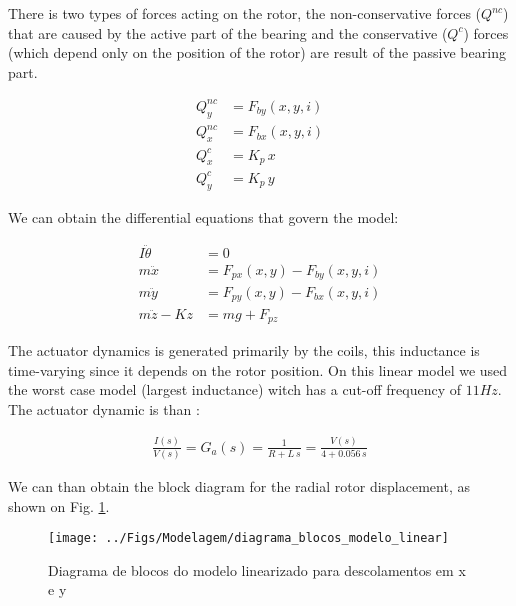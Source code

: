 \documentclass[10pt,fleqn,a4paper,twoside]{article}
\begin{document}
	There is two types of forces acting on the rotor, the  non-conservative forces ($Q^{nc}$) that are caused by the active part of the bearing and the conservative ($Q^{c}$) forces (which depend only on the position of the rotor) are result of the passive bearing part.
	
	\begin{align}
		Q_y^{nc} &= F_{by}(x,y,i)  \\
		Q_x^{nc} &= F_{bx}(x,y,i)  \\
		Q^{c}_x &= K_p \, x \\
		Q^{c}_y &= K_p \, y 
	\end{align}
	
	We can obtain the differential equations that govern the model:
	
	
	\begin{align}
		I \ddot{\theta} &= 0 \\
		m \ddot{x}		&=  F_{px}(x,y) - F_{by}(x,y,i) \\
		m \ddot{y}		&=  F_{py}(x,y) - F_{bx}(x,y,i)\\	
		m \ddot{z} - K z &= m g  + F_{pz}
	\end{align}
	
	
	The actuator dynamics is generated primarily by the coils,  this inductance is time-varying since it depends on the rotor position. On this linear model we used the worst case model (largest inductance) witch has a cut-off frequency of $11Hz$. The actuator dynamic is than :
	
	\begin{align}
		\frac{I(s)}{V(s)} = G_a(s) = \frac{1}{R + L \, s} = \frac{V(s)}{4 + 0.056 \, s}
	\end{align}
	
	We can than obtain the block diagram for the radial rotor displacement, as shown on Fig. \ref{fig:diagrama:blocos:modelo:linear}.
	
	\begin{figure}[th!]
		\centering
		\texttt{[image: ../Figs/Modelagem/diagrama\_blocos\_modelo\_linear]}
		\caption{Diagrama de blocos do modelo linearizado para descolamentos em x e y}
		\label{fig:diagrama:blocos:modelo:linear}
	\end{figure}
	
\end{document}
